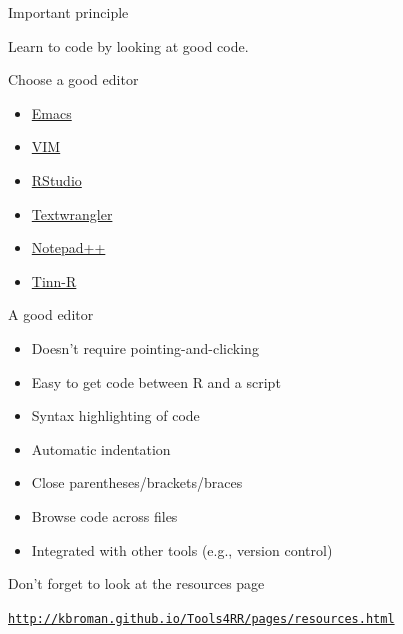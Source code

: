 \documentclass[12pt,t]{beamer}
\newcommand{\bi}{\begin{itemize}}
\newcommand{\ei}{\end{itemize}}
\begin{document}
\begin{frame}[c]{Important principle}

\centerline{Learn to code by looking at good code.}

\end{frame}



\begin{frame}{Choose a good editor}

\vspace{24pt}

\bi
\itemsep12pt
\item \href{http://www.emacswiki.org/emacs/}{Emacs}
\item \href{http://www.vim.org/}{VIM}
\item \href{http://www.rstudio.com/ide/}{RStudio}
\item \href{http://www.barebones.com/products/textwrangler/}{Textwrangler}
\item \href{http://notepad-plus-plus.org/}{Notepad++}
\item \href{http://sourceforge.net/projects/tinn-r/}{Tinn-R}
\ei

\end{frame}


\begin{frame}{A good editor}

\vspace{24pt}

\bi
\itemsep12pt
\item Doesn't require pointing-and-clicking
\item Easy to get code between R and a script
\item Syntax highlighting of code
\item Automatic indentation
\item Close parentheses/brackets/braces
\item Browse code across files
\item Integrated with other tools (e.g., version control)
\ei

\end{frame}


\begin{frame}[c]{Don't forget to look at the resources page}


\centerline{\href{http://kbroman.github.io/Tools4RR/pages/resources.html}{\tt http://kbroman.github.io/Tools4RR/pages/resources.html}}

\end{frame}
\end{document}
